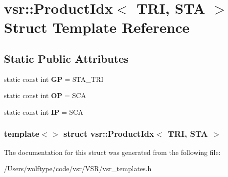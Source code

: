 \hypertarget{structvsr_1_1_product_idx_3_01_t_r_i_00_01_s_t_a_01_4}{\section{vsr\-:\-:Product\-Idx$<$ T\-R\-I, S\-T\-A $>$ Struct Template Reference}
\label{structvsr_1_1_product_idx_3_01_t_r_i_00_01_s_t_a_01_4}
}
\subsection*{Static Public Attributes}
\begin{DoxyCompactItemize}
\item 
\hypertarget{structvsr_1_1_product_idx_3_01_t_r_i_00_01_s_t_a_01_4_a2fb35af3687bff3385c9b778371d4709}{static const int {\bfseries G\-P} = S\-T\-A\-\_\-\-T\-R\-I}\label{structvsr_1_1_product_idx_3_01_t_r_i_00_01_s_t_a_01_4_a2fb35af3687bff3385c9b778371d4709}

\item 
\hypertarget{structvsr_1_1_product_idx_3_01_t_r_i_00_01_s_t_a_01_4_a28ee513a4cc2e99976adae81f53db2d2}{static const int {\bfseries O\-P} = S\-C\-A}\label{structvsr_1_1_product_idx_3_01_t_r_i_00_01_s_t_a_01_4_a28ee513a4cc2e99976adae81f53db2d2}

\item 
\hypertarget{structvsr_1_1_product_idx_3_01_t_r_i_00_01_s_t_a_01_4_a22bfe1ab28c32ca0e57d05574222d7c5}{static const int {\bfseries I\-P} = S\-C\-A}\label{structvsr_1_1_product_idx_3_01_t_r_i_00_01_s_t_a_01_4_a22bfe1ab28c32ca0e57d05574222d7c5}

\end{DoxyCompactItemize}
\subsubsection*{template$<$$>$ struct vsr\-::\-Product\-Idx$<$ T\-R\-I, S\-T\-A $>$}



The documentation for this struct was generated from the following file\-:\begin{DoxyCompactItemize}
\item 
/\-Users/wolftype/code/vsr/\-V\-S\-R/vsr\-\_\-templates.\-h\end{DoxyCompactItemize}
